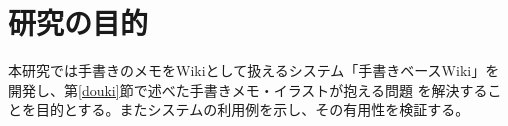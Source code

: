 %

\section{研究の目的}
本研究では手書きのメモをWikiとして扱えるシステム「手書きベースWiki」を開発し、第\ref{douki}節で述べた手書きメモ・イラストが抱える問題
を解決することを目的とする。またシステムの利用例を示し、その有用性を検証する。


